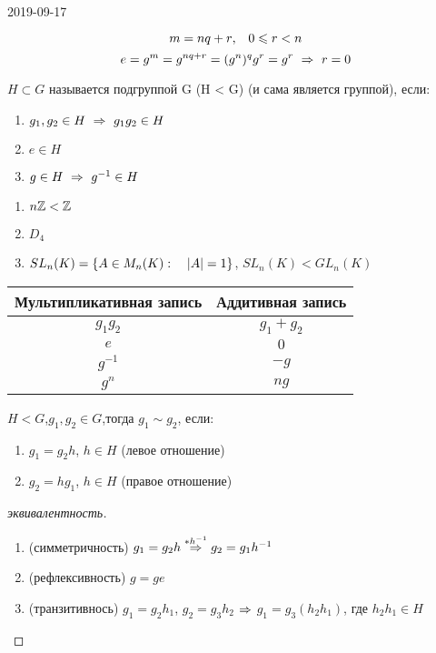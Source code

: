 \documentclass[main]{subfiles}
\begin{document}
\begin{lect}{2019-09-17}
    \begin{Proof}
        \[m=n q+r$,\q $0 \leqslant r < n\]
        \[e=g^m=g^{n q + r}=(g^n)^q g^r=g^r \ \Rightarrow\  r=0\]
    \end{Proof}

    \begin{definition}
        $H \subset G$ называется подгруппой G (H < G) (и сама является группой), если:
        \begin{enumerate}
        	\item $g_1,g_2 \in H \ \Rightarrow\  g_1 g_2 \in H$
        	\item $e \in H$
        	\item $g \in H \ \Rightarrow\  g^{-1} \in H$
    	\end{enumerate}
    \end{definition}

    \begin{examples}
        \begin{enumerate}
        	\item $n\mathbb{Z} < \mathbb{Z}$
        	\item $D_4$
        	\item $SL_n(K)=\{A \in M_n(K): \quad |A|=1\}$, $SL_n(K)<GL_n(K)$
    	\end{enumerate}
    \end{examples}

    \begin{tabular} {c|c}
    	Мультипликативная запись & Аддитивная запись\\ \hline
    	$g_1 g_2$ & $g_1 + g_2$\\
    	$e$ & $0$\\
    	$g^{-1}$ & $-g$\\
        $g^n$ & $ng$
    \end{tabular}

    \begin{definition}
        $H<G$,\q $g_1,g_2 \in G$,\q тогда $g_1 \sim g_2$, если:
        \begin{enumerate}
        	\item $g_1=g_2 h$, $h \in H$ (левое отношение)
        	\item $g_2=h g_1$, $h \in H$ (правое отношение)
    	\end{enumerate}
    \end{definition}

    \begin{proof}[эквивалентность]
        \begin{enumerate}
        	\item (симметричность) $g_1=g_2 h \overset{*h^{-1}}{\Rightarrow} g_2 = g_1 h^{-1}$
        	\item (рефлексивность) $g=ge$
        	\item (транзитивнось) $g_1=g_2 h_1$, $g_2 = g_3 h_2$ $\Rightarrow$ $g_1=g_3(h_2 h_1)$, где $h_2 h_1 \in H$
    	\end{enumerate}
    \end{proof}


\end{lect}
\end{document}

